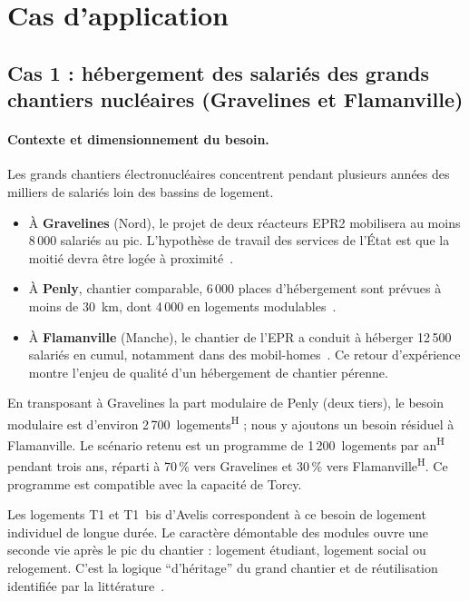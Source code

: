 \documentclass[11pt,a4paper]{article}
\newcommand{\hyp}{\textsuperscript{\textsf{H}}}
\begin{document}
\section{Cas d'application}\label{sec:cas}

\subsection{Cas 1 : hébergement des salariés des grands chantiers nucléaires (Gravelines et
Flamanville)}

\paragraph{Contexte et dimensionnement du besoin.} Les grands chantiers électronucléaires
concentrent pendant plusieurs années des milliers de salariés loin des bassins de logement.
\begin{itemize}
  \item À \textbf{Gravelines} (Nord), le projet de deux réacteurs EPR2 mobilisera au moins 8\,000
        salariés au pic. L'hypothèse de travail des services de l'État est que la moitié devra être
        logée à proximité~\cite{prefgravelines}.
  \item À \textbf{Penly}, chantier comparable, 6\,000 places d'hébergement sont prévues à moins de
        30~km, dont 4\,000 en logements modulables~\cite{prefpenly}.
  \item À \textbf{Flamanville} (Manche), le chantier de l'EPR a conduit à héberger 12\,500 salariés
        en cumul, notamment dans des mobil-homes~\cite{aieflamanville}. Ce retour d'expérience
        montre l'enjeu de qualité d'un hébergement de chantier pérenne.
\end{itemize}
En transposant à Gravelines la part modulaire de Penly (deux tiers), le besoin modulaire est
d'environ 2\,700~logements\hyp{} ; nous y ajoutons un besoin résiduel à Flamanville. Le
scénario retenu est un programme de 1\,200~logements par an\hyp{} pendant trois ans, réparti à
70\,\% vers Gravelines et 30\,\% vers Flamanville\hyp. Ce programme est compatible avec la capacité
de Torcy.

Les logements T1 et T1~bis d'Avelis correspondent à ce besoin de logement individuel de longue
durée. Le caractère démontable des modules ouvre une seconde vie après le pic du chantier :
logement étudiant, logement social ou relogement. C'est la logique \enquote{d'héritage} du grand
chantier et de réutilisation identifiée par la littérature~\cite{kamali2016}.
\end{document}
